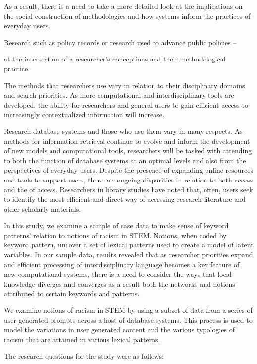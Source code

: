 As a result, there is a need to take a more detailed look at the implications on the social construction of methodologies and how systems inform the practices of everyday users.

Research such as policy records or research used to advance public policies -- 


at the intersection of a researcher's conceptions and their methodological practice. 

The methods that researchers use vary in relation to their disciplinary domains and search priorities. As more computational and interdisciplinary tools are developed, the ability for researchers and general users to gain efficient access to increasingly contextualized information will increase.

Research database systems and those who use them vary in many respects. As methods for information retrieval continue to evolve and inform the development of new models and computational tools, researchers will be tasked with attending to both the function of database systems at an optimal levels and also from the perspectives of everyday users. Despite the presence of expanding online resources and tools to support users, there are ongoing disparities in relation to both access and the  of access. Researchers in library studies have noted that, often, users seek to identify the most efficient and direct way of accessing research literature and other scholarly materials.

In this study, we examine a sample of case data to make sense of keyword patterns' relation to notions of racism in STEM. Notions, when coded by keyword pattern, uncover a set of lexical patterns used to create a model of latent variables. In our sample data, results revealed that as researcher priorities expand and efficient processing of interdisciplinary language becomes a key feature of new computational systems, there is a need to consider the ways that local knowledge diverges and converges as a result both the networks and notions attributed to certain keywords and patterns.

We examine notions of racism in STEM by using a subset of data from a series of user generated prompts across a host of database systems. This process is used to model the variations in user generated content and the various typologies of racism that are attained in various lexical patterns.

\noindent The research questions for the study were as follows:

